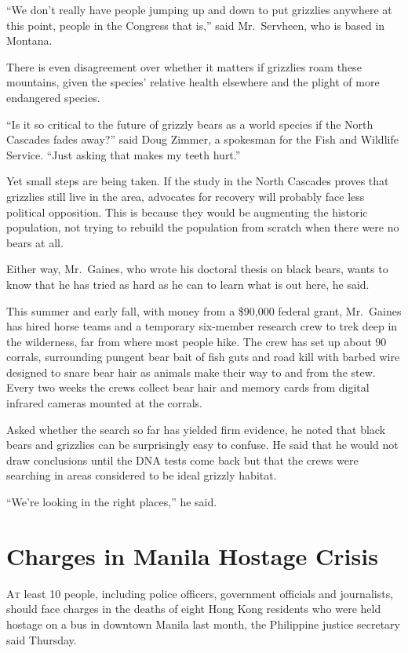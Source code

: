 ﻿\documentclass[12pt]{article}
\begin{document}
``We don't really have people jumping up and down to put grizzlies anywhere at this point, people in
the Congress that is,'' said Mr.~Servheen, who is based in Montana.

There is even disagreement over whether it matters if grizzlies roam these mountains, given the
species' relative health elsewhere and the plight of more endangered species.

``Is it so critical to the future of grizzly bears as a world species if the North Cascades fades
away?'' said Doug Zimmer, a spokesman for the Fish and Wildlife Service. ``Just asking that makes my
teeth hurt.''

Yet small steps are being taken. If the study in the North Cascades proves that grizzlies still live
in the area, advocates for recovery will probably face less political opposition. This is because
they would be augmenting the historic population, not trying to rebuild the population from scratch
when there were no bears at all.

Either way, Mr.~Gaines, who wrote his doctoral thesis on black bears, wants to know that he has
tried as hard as he can to learn what is out here, he said.

This summer and early fall, with money from a \$90,000 federal grant, Mr.~Gaines has hired horse
teams and a temporary six-member research crew to trek deep in the wilderness, far from where most
people hike. The crew has set up about 90 corrals, surrounding pungent bear bait of fish guts and
road kill with barbed wire designed to snare bear hair as animals make their way to and from the
stew. Every two weeks the crews collect bear hair and memory cards from digital infrared cameras
mounted at the corrals.

Asked whether the search so far has yielded firm evidence, he noted that black bears and grizzlies
can be surprisingly easy to confuse. He said that he would not draw conclusions until the DNA tests
come back but that the crews were searching in areas considered to be ideal grizzly habitat.

``We're looking in the right places,'' he said.

\pagebreak
\section{Charges in Manila Hostage Crisis}

\lettrine{A}{t} least 10 people, including police officers, government
officials and journalists, should face charges in the deaths of eight Hong Kong residents who were
held hostage on a bus in downtown Manila last month, the Philippine justice secretary said Thursday.
\end{document}
